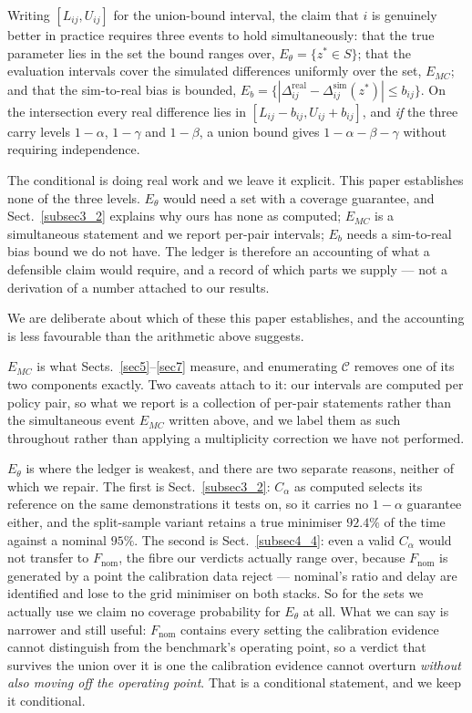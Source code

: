 \documentclass[pdflatex,iicol,sn-apa]{sn-jnl}
\theoremstyle{remark}
\begin{document}
Writing $[L_{ij}, U_{ij}]$ for the union-bound interval, the claim that $i$ is genuinely better in
practice requires three events to hold simultaneously: that the true parameter lies in the set the
bound ranges over, $E_\theta = \{z^* \in S\}$; that the evaluation intervals cover the simulated
differences uniformly over the set, $E_{MC}$; and that the sim-to-real bias is bounded,
$E_b = \{|\Delta^{\mathrm{real}}_{ij} - \Delta^{\mathrm{sim}}_{ij}(z^*)| \le b_{ij}\}$. On the
intersection every real difference lies in $[L_{ij} - b_{ij}, U_{ij} + b_{ij}]$, and \emph{if} the
three carry levels $1-\alpha$, $1-\gamma$ and $1-\beta$, a union bound gives
$1 - \alpha - \beta - \gamma$ without requiring independence.

The conditional is doing real work and we leave it explicit. This paper establishes none of the
three levels. $E_\theta$ would need a set with a coverage guarantee, and Sect.~\ref{subsec3_2}
explains why ours has none as computed; $E_{MC}$ is a simultaneous statement and we report per-pair
intervals; $E_b$ needs a sim-to-real bias bound we do not have. The ledger is therefore an accounting
of what a defensible claim would require, and a record of which parts we supply --- not a derivation
of a number attached to our results.

We are deliberate about which of these this paper establishes, and the accounting is less favourable
than the arithmetic above suggests.

$E_{MC}$ is what Sects.~\ref{sec5}--\ref{sec7} measure, and enumerating $\mathcal{C}$ removes one of
its two components exactly. Two caveats attach to it: our intervals are computed per policy pair, so
what we report is a collection of per-pair statements rather than the simultaneous event
$E_{MC}$ written above, and we label them as such throughout rather than applying a multiplicity
correction we have not performed.

$E_\theta$ is where the ledger is weakest, and there are two separate reasons, neither of which we
repair. The first is Sect.~\ref{subsec3_2}: $C_\alpha$ as computed selects its reference on the same
demonstrations it tests on, so it carries no $1-\alpha$ guarantee either, and the split-sample
variant retains a true minimiser $92.4\%$ of the time against a nominal $95\%$. The second is
Sect.~\ref{subsec4_4}: even a valid $C_\alpha$ would not transfer to $F_{\mathrm{nom}}$, the fibre
our verdicts actually range over, because $F_{\mathrm{nom}}$ is generated by a
point the calibration data reject --- nominal's ratio and delay are identified and lose to the grid
minimiser on both stacks. So for the sets we actually use we claim no coverage
probability for $E_\theta$ at all. What we can say is narrower and still useful: $F_{\mathrm{nom}}$
contains every setting the calibration evidence cannot distinguish from the benchmark's operating
point, so a verdict that survives the union over it is one the calibration evidence cannot overturn
\emph{without also moving off the operating point}. That is a conditional statement, and we keep it
conditional.
\end{document}
